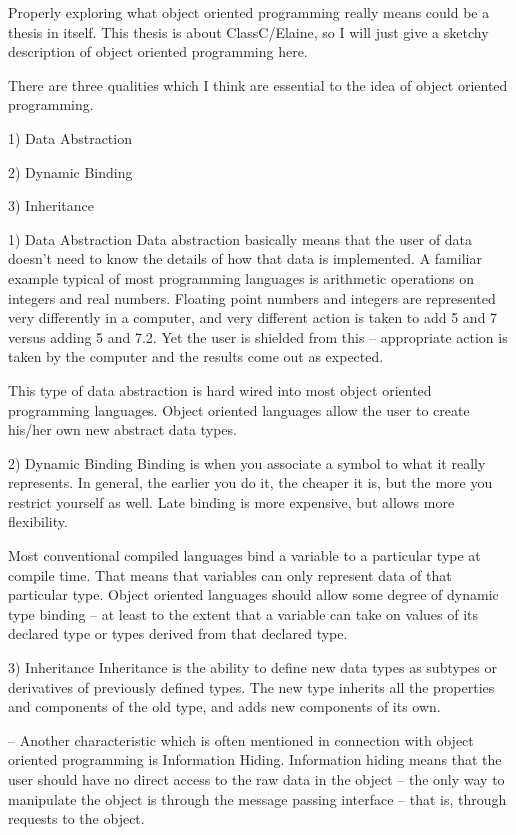 Properly exploring what object oriented programming really means could be a
thesis in itself.  This thesis is about ClassC/Elaine, so I
will just give a sketchy description of object oriented programming here.

There are three qualities which I think are essential to the idea of object
oriented programming.

1)	Data Abstraction

2)	Dynamic Binding

3)	Inheritance


1)	Data Abstraction
	Data abstraction basically means that the user of data doesn't need
to know the details of how that data is implemented.
A familiar example 
typical of most programming languages is arithmetic operations on integers
and real numbers.  Floating point numbers and integers are represented
very differently in a computer, and very different action is taken to
add 5 and 7 versus
adding 5 and 7.2.  Yet the user is shielded from this --  appropriate action
is taken by the computer and the results come out as expected.

This type of data abstraction is hard wired into most object oriented
programming languages.  Object oriented languages allow the user to 
create his/her own new abstract data types.

2)	Dynamic Binding
	Binding is when you associate a symbol to what it really represents.
In general, the earlier you do it, the cheaper it is, but the more you
restrict yourself as well.
Late binding is more expensive, but allows more flexibility.  

Most conventional compiled languages bind a variable to a particular type at
compile time.  That means that variables can only represent data of that
particular type.  Object oriented languages should allow some degree of
dynamic type binding -- at least to the extent that a variable can take on
values of its declared type or types derived from that declared type.

3)	Inheritance
	Inheritance is the ability to define new data types as 
subtypes or derivatives of previously defined types.  The new type 
inherits all the properties and components of the old type, and
adds new components of its own.

-- Another characteristic which is often mentioned in connection with object
oriented programming is \fB Information Hiding\fP.  Information hiding 
means that the user should have no direct access to the raw data
in the object --
the only way to manipulate the object is through the message passing
interface -- that is, through requests to the object.

